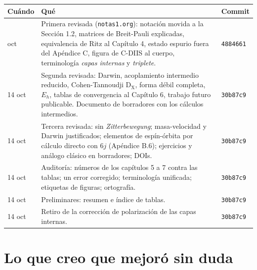 \documentclass[11pt,a4paper]{article}
\newcommand{\arch}[1]{\texttt{\small #1}}
\begin{document}
\begin{longtable}{L{2.3cm}L{10.7cm}L{2.0cm}}
\toprule
\textbf{Cuándo} & \textbf{Qué} & \textbf{Commit}\\
\midrule
\endhead
\bottomrule
{} oct & Primera revisada (\arch{notas1.org}): notación movida a la Sección 1.2, matrices de Breit-Pauli explicadas, equivalencia de Ritz al Capítulo 4, estado espurio fuera del Apéndice C, figura de C-DIIS al cuerpo, terminología \emph{capas internas} y \emph{triplete}. & \texttt{4884661}\\
14 oct & Segunda revisada: Darwin, acoplamiento intermedio reducido, Cohen-Tannoudji D$_\text{X}$, forma débil completa, $E_h$, tablas de convergencia al Capítulo 6, trabajo futuro publicable. Documento de borradores con los cálculos intermedios. & \texttt{30b87c9}\\
14 oct & Tercera revisada: sin \emph{Zitterbewegung}; masa-velocidad y Darwin justificados; elementos de espín-órbita por cálculo directo con $6j$ (Apéndice B.6); ejercicios y análogo clásico en borradores; DOIs. & \texttt{30b87c9}\\
14 oct & Auditoría: números de los capítulos 5 a 7 contra las tablas; un error corregido; terminología unificada; etiquetas de figuras; ortografía. & \texttt{30b87c9}\\
14 oct & Preliminares: resumen e índice de tablas. & \texttt{30b87c9}\\
14 oct & Retiro de la corrección de polarización de las capas internas. & \texttt{30b87c9}\\
\end{longtable}

\section{Lo que creo que mejoró sin duda}
\end{document}
